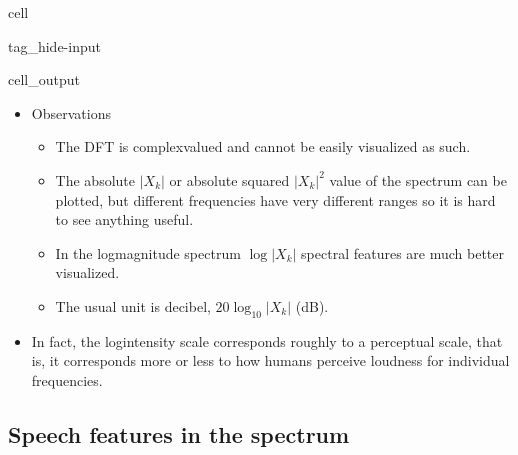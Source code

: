 \documentclass[letterpaper,10pt,english]{jupyterBook}
\begin{document}
\begin{sphinxuseclass}{cell}
\begin{sphinxuseclass}{tag_hide-input}\begin{sphinxVerbatimOutput}

\begin{sphinxuseclass}{cell_output}
\noindent{}

\end{sphinxuseclass}\end{sphinxVerbatimOutput}

\end{sphinxuseclass}
\end{sphinxuseclass}\begin{itemize}
\item {} 
\sphinxAtStartPar
Observations
\begin{itemize}
\item {} 
\sphinxAtStartPar
The DFT is complex\sphinxhyphen{}valued and cannot be easily visualized as such.

\item {} 
\sphinxAtStartPar
The absolute \(|X_k|\) or absolute squared \(|X_k|^2\)  value of the spectrum can be plotted, but different frequencies have very different ranges so it is hard to see anything useful.

\item {} 
\sphinxAtStartPar
In the log\sphinxhyphen{}magnitude spectrum \(\log|X_k|\)  spectral features are much better visualized.

\item {} 
\sphinxAtStartPar
The usual unit is decibel, \(20\log_{10}|X_k|\) (dB).

\end{itemize}

\item {} 
\sphinxAtStartPar
In fact, the log\sphinxhyphen{}intensity scale corresponds roughly to a perceptual scale, that is, it corresponds more or less to how humans perceive loudness for individual frequencies.

\end{itemize}


\subsection{Speech features in the spectrum}
\label{\detokenize{Representations/Short-time_analysis:speech-features-in-the-spectrum}}
\end{document}
